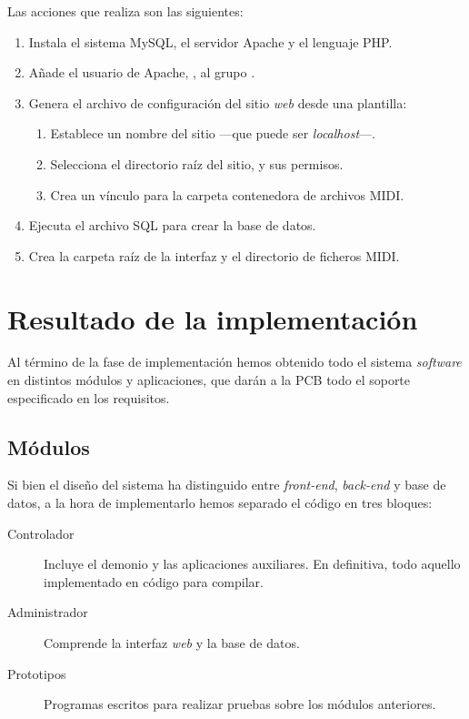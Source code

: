 Las acciones que realiza son las siguientes:

\begin{enumerate}
	\item Instala el sistema MySQL, el servidor Apache y el lenguaje PHP.
	\item Añade el usuario de Apache, , al grupo .
	\item Genera el archivo de configuración del sitio \textit{web} desde una plantilla:
	
	\begin{enumerate}
		\item Establece un nombre del sitio ---que puede ser \textit{localhost}---.
		\item Selecciona el directorio raíz del sitio, y sus permisos.
		\item Crea un vínculo para la carpeta contenedora de archivos \acrshort{MIDI}.
	\end{enumerate}
	
	\item Ejecuta el archivo \acrshort{SQL} para crear la base de datos.
	\item Crea la carpeta raíz de la interfaz y el directorio de ficheros \acrshort{MIDI}.
\end{enumerate}

\section{Resultado de la implementación}

Al término de la fase de implementación hemos obtenido todo el sistema \textit{software} en distintos módulos y aplicaciones, que darán a la \acrshort{PCB} todo el soporte especificado en los requisitos.

\subsection{Módulos}

Si bien el diseño del sistema ha distinguido entre \textit{front-end}, \textit{back-end} y base de datos, a la hora de implementarlo hemos separado el código en tres bloques:

\begin{description}
	\item[Controlador] Incluye el demonio y las aplicaciones auxiliares. En definitiva, todo aquello implementado en código para compilar.
	\item[Administrador] Comprende la interfaz \textit{web} y la base de datos.
	\item[Prototipos] Programas escritos para realizar pruebas sobre los módulos anteriores.
\end{description}

